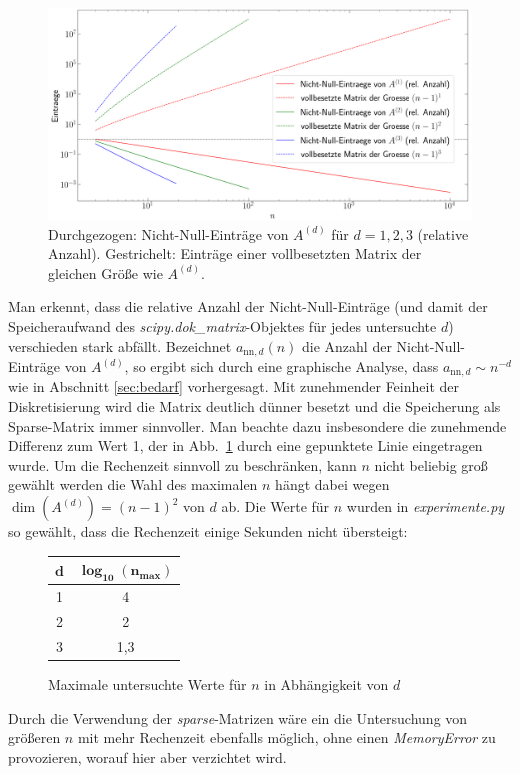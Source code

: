 \documentclass[smallheadings]{scrartcl}
\begin{document}
\begin{figure}[H]
\includegraphics[width=\textwidth]{Bilder/nn_eintraege}

\caption{Durchgezogen: Nicht-Null-Einträge von $A^{(d)}$ für $d=1,2,3$ (relative Anzahl). Gestrichelt: Einträge einer vollbesetzten Matrix der gleichen Größe wie $A^{(d)}$.}
\label{im:nn_eintr}
\end{figure}



Man erkennt, dass die relative Anzahl der Nicht-Null-Einträge (und damit der Speicheraufwand des \textit{scipy.dok\_matrix}-Objektes für jedes untersuchte $d$) verschieden stark abfällt. Bezeichnet $a_{\text{nn},d}(n)$ die Anzahl der 
Nicht-Null-Einträge von $A^{(d)}$, so ergibt sich durch eine graphische Analyse, dass $a_{\text{nn},d}\sim n^{-d}$ wie in Abschnitt \ref{sec:bedarf} vorhergesagt. Mit zunehmender Feinheit der Diskretisierung wird die Matrix deutlich dünner besetzt und die Speicherung als Sparse-Matrix immer sinnvoller. Man beachte dazu insbesondere die zunehmende Differenz zum Wert 1, der in Abb.~\ref{im:nn_eintr} durch eine gepunktete Linie eingetragen wurde. 
Um die Rechenzeit sinnvoll zu beschränken, kann $n$ nicht beliebig groß gewählt werden die Wahl des maximalen $n$ hängt dabei wegen $\dim(A^{(d)})=(n-1)^2$ von $d$ ab. Die Werte für $n$ wurden in \textit{experimente.py} so gewählt, dass die Rechenzeit einige Sekunden nicht übersteigt:
\begin{figure}[H]
\centering
\begin{tabular}{|c|c|}
\hline
$\boldsymbol{d}$ & $\boldsymbol{\log_{10}(n_{max})}$\\
\hline
1 & 4\\
\hline
2 & 2\\
\hline
3 & 1,3\\
\hline

\end{tabular}
\caption{Maximale untersuchte Werte für $n$ in Abhängigkeit von $d$}
\end{figure}
Durch die Verwendung der \textit{sparse}-Matrizen wäre ein die Untersuchung von größeren $n$ mit mehr Rechenzeit ebenfalls möglich, ohne einen \textit{MemoryError} zu provozieren, worauf hier aber verzichtet wird.
\end{document}
